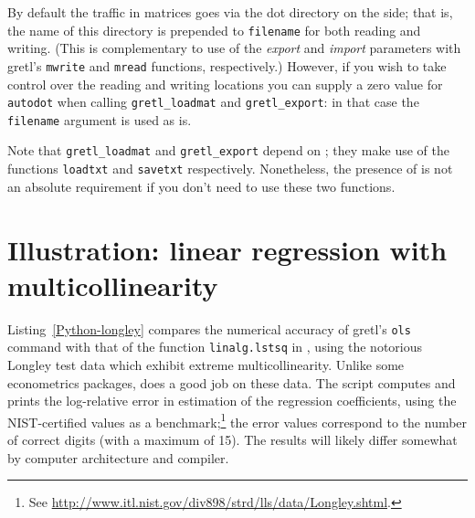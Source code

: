 By default the traffic in matrices goes via the dot directory on the
 side; that is, the name of this directory is prepended to
\texttt{filename} for both reading and writing. (This is complementary
to use of the \textsl{export} and \textsl{import} parameters with
gretl's \texttt{mwrite} and \texttt{mread} functions,
respectively.) However, if you wish to take control over the reading
and writing locations you can supply a zero value for
\texttt{autodot} when calling \verb|gretl_loadmat| and
\verb|gretl_export|: in that case the \texttt{filename} argument is
used as is.

Note that \verb|gretl_loadmat| and \verb|gretl_export| depend on
; they make use of the functions \texttt{loadtxt} and
\texttt{savetxt} respectively. Nonetheless, the presence of
 is not an absolute requirement if you don't need
to use these two functions.

\section{Illustration: linear regression with multicollinearity}
\label{sec:Python-longley}

Listing~\ref{Python-longley} compares the numerical accuracy of
gretl's \texttt{ols} command with that of the function
\texttt{linalg.lstsq} in , using the notorious Longley test
data which exhibit extreme multicollinearity.  Unlike some
econometrics packages,  does a good job on these data. The
script computes and prints the log-relative error in estimation of the
regression coefficients, using the NIST-certified values as a
benchmark;\footnote{See
  \url{http://www.itl.nist.gov/div898/strd/lls/data/Longley.shtml}.}
the error values correspond to the number of correct digits (with a
maximum of 15). The results will likely differ somewhat by computer
architecture and compiler.


